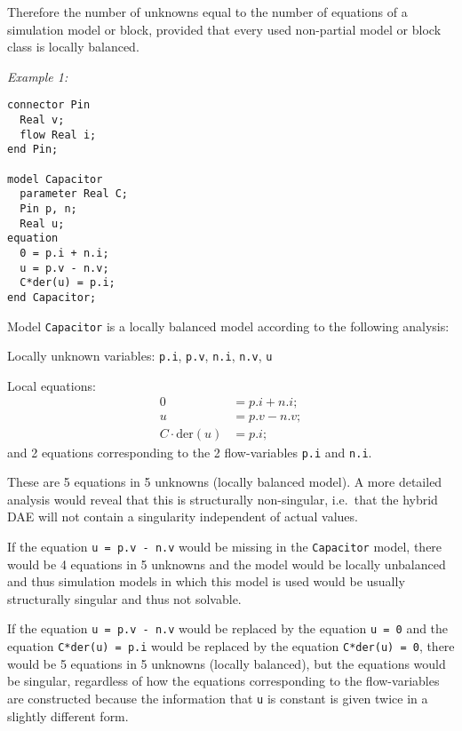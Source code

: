 \begin{nonnormative}
Therefore the number of unknowns equal to the number of equations of a simulation model or block, provided that every used
non-partial model or block class is locally balanced.
\end{nonnormative}

\begin{example}
\emph{Example 1:}
\begin{lstlisting}[language=modelica]
connector Pin
  Real v;
  flow Real i;
end Pin;

model Capacitor
  parameter Real C;
  Pin p, n;
  Real u;
equation
  0 = p.i + n.i;
  u = p.v - n.v;
  C*der(u) = p.i;
end Capacitor;
\end{lstlisting}

Model \lstinline!Capacitor! is a locally balanced model according to the following analysis:

Locally unknown variables: \lstinline!p.i!, \lstinline!p.v!, \lstinline!n.i!, \lstinline!n.v!, \lstinline!u!

Local equations:
\begin{align*}
0 &= p.i + n.i;\\
u &= p.v - n.v;\\
C \cdot \text{der}(u) &= p.i;
\end{align*}
and 2 equations corresponding to the 2 flow-variables \lstinline!p.i! and \lstinline!n.i!.

These are 5 equations in 5 unknowns (locally balanced model).  A more detailed analysis would reveal that this is structurally non-singular, i.e.\ that
the hybrid DAE will not contain a singularity independent of actual values.

If the equation \lstinline!u = p.v - n.v! would be missing in the \lstinline!Capacitor! model, there would be 4 equations in 5 unknowns and the model
would be locally unbalanced and thus simulation models in which this model is used would be usually structurally singular and thus not solvable.

If the equation \lstinline!u = p.v - n.v! would be replaced by the equation \lstinline!u = 0! and the equation \lstinline!C*der(u) = p.i! would be
replaced by the equation \lstinline!C*der(u) = 0!, there would be 5 equations in 5 unknowns (locally balanced), but the equations would be singular,
regardless of how the equations corresponding to the flow-variables are constructed because the information that \lstinline!u! is constant is given twice
in a slightly different form.
\end{example}

